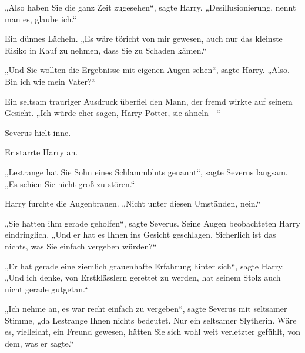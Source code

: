 „Also haben Sie die ganz Zeit zugesehen“, sagte Harry. „Desillusionierung, nennt man es, glaube ich.“

Ein dünnes Lächeln. „Es wäre töricht von mir gewesen, auch nur das kleinste Risiko in Kauf zu nehmen, dass Sie zu Schaden kämen.“

„Und Sie wollten die Ergebnisse mit eigenen Augen sehen“, sagte Harry. „Also. Bin ich wie mein Vater?“

Ein seltsam trauriger Ausdruck überfiel den Mann, der fremd wirkte auf seinem Gesicht. „Ich würde eher sagen, Harry Potter, sie ähneln—“

Severus hielt inne.

Er starrte Harry an.

„Lestrange hat Sie Sohn eines Schlammbluts genannt“, sagte Severus langsam. „Es schien Sie nicht groß zu stören.“

Harry furchte die Augenbrauen. „Nicht unter diesen Umständen, nein.“

„Sie hatten ihm gerade geholfen“, sagte Severus. Seine Augen beobachteten Harry eindringlich. „Und er hat es Ihnen ins Gesicht geschlagen. Sicherlich ist das nichts, was Sie einfach vergeben würden?“

„Er hat gerade eine ziemlich grauenhafte Erfahrung hinter sich“, sagte Harry. „Und ich denke, von Erstklässlern gerettet zu werden, hat seinem Stolz auch nicht gerade gutgetan.“

„Ich nehme an, es war recht einfach zu vergeben“, sagte Severus mit seltsamer Stimme, „da Lestrange Ihnen nichts bedeutet. Nur ein seltsamer Slytherin. Wäre es, vielleicht, ein Freund gewesen, hätten Sie sich wohl weit verletzter gefühlt, von dem, was er sagte.“

